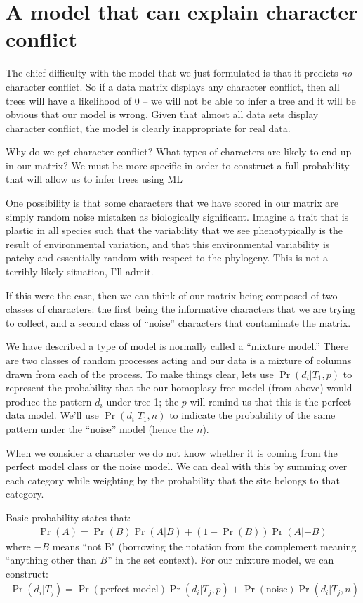\documentclass[11pt]{article}
\begin{document}
\section*{A model that can explain character conflict}
The chief difficulty with the model that we just formulated is that it predicts {\em no}
character conflict.
So if a data matrix displays any character conflict, then all trees will have a
likelihood of 0 -- we will not be able to infer a tree and it will be obvious that our model is wrong.
Given that almost all data sets display character conflict, the model is clearly
inappropriate for real data.

Why do we get character conflict? What types of characters are likely to end up in our 
matrix? We must be more specific in order to construct a full probability that will allow
us to infer trees using ML

One possibility is that some characters that we 
have scored in our matrix are simply random noise mistaken as biologically significant.
Imagine a  trait that is plastic in all species such that the variability that we see
phenotypically is the result of environmental variation, and that this environmental 
variability is patchy and essentially random with respect to the phylogeny.
This is not a terribly likely situation, I'll admit.

If this were the case, then we can think of our matrix being composed of two classes
of characters: the first being the informative characters that we are trying to collect, 
and a second class of ``noise'' characters that contaminate the matrix.

We have described a type of model is normally called a ``mixture model.''
There are two classes of random processes acting and our data is a mixture of columns
drawn from each of the process.
To make things clear, lets use $\Pr(d_i|T_1,p)$ to represent the probability that the
our homoplasy-free model (from above) would produce the pattern $d_i$
under tree 1; the $p$ will remind us that this is the perfect data model.
We'll use $\Pr(d_i|T_1,n)$ to indicate the probability of the same pattern under the 
``noise'' model (hence the $n$).

When we consider a character we do not know whether it is coming from the perfect model
class or the noise model.
We can deal with this by summing over each category while weighting by the probability
that the site belongs to that category.

Basic probability states that:
\begin{eqnarray}
	\Pr(A) = \Pr(B)\Pr(A|B) + (1-\Pr(B))\Pr(A|-B)
\end{eqnarray}
where $-{B}$ means ``not B" (borrowing the notation from the complement meaning ``anything other than $B$'' in the set context).
For our mixture model, we can construct:
\begin{eqnarray}
	\Pr(d_i|T_j) = \Pr(\mbox{perfect model})\Pr(d_i|T_j,p) + \Pr(\mbox{noise})\Pr(d_i|T_j,n)
\end{eqnarray}
\end{document}
